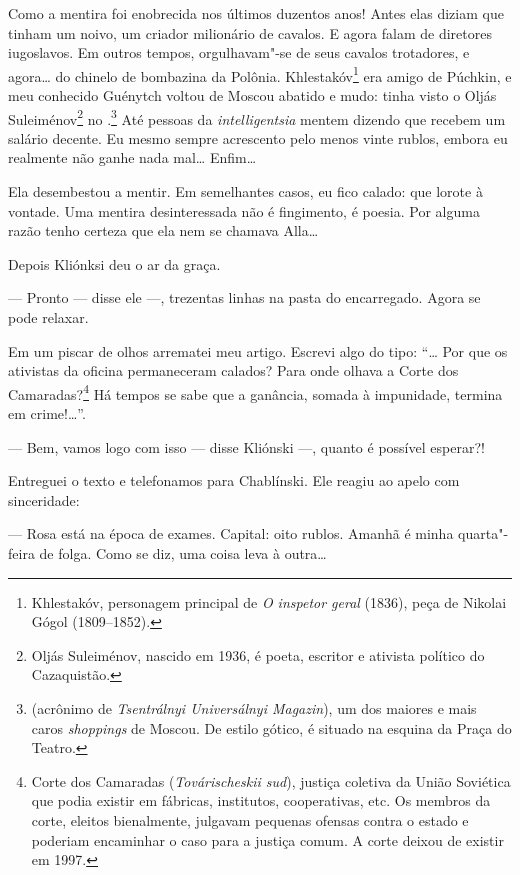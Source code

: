 Como a mentira foi enobrecida nos últimos duzentos anos! Antes elas
diziam que tinham um noivo, um criador milionário de cavalos. E agora
falam de diretores iugoslavos. Em outros tempos, orgulhavam"-se de seus
cavalos trotadores, e agora\ldots{} do chinelo de bombazina da Polônia.
Khlestakóv\footnote{Khlestakóv, personagem principal de \emph{O inspetor
  geral} (1836), peça de Nikolai Gógol (1809--1852).} era amigo
de Púchkin, e meu conhecido Guénytch voltou de Moscou abatido e mudo:
tinha visto o Oljás Suleiménov\footnote{Oljás Suleiménov, nascido em
  1936, é poeta, escritor e ativista político do Cazaquistão.} no
.\footnote{ (acrônimo de \emph{Tsentrálnyi Universálnyi
  Magazin}), um dos maiores e mais caros \emph{shoppings} de Moscou. De
  estilo gótico, é situado na esquina da Praça do Teatro.} Até pessoas
da \emph{intelligentsia} mentem dizendo que recebem um salário decente.
Eu mesmo sempre acrescento pelo menos vinte rublos, embora eu realmente
não ganhe nada mal\ldots{} Enfim\ldots{}

Ela desembestou a mentir. Em semelhantes casos, eu fico calado: que
lorote à vontade. Uma mentira desinteressada não é fingimento, é poesia.
Por alguma razão tenho certeza que ela nem se chamava Alla\ldots{}

Depois Kliónksi deu o ar da graça.

--- Pronto --- disse ele ---, trezentas linhas na pasta do encarregado.
Agora se pode relaxar.

Em um piscar de olhos arrematei meu artigo. Escrevi algo do tipo: ``\ldots{}
Por que os ativistas da oficina permaneceram calados? Para onde olhava a
Corte dos Camaradas?\footnote{Corte dos Camaradas (\emph{Továrischeskii
sud}), justiça coletiva da União Soviética que podia existir em
  fábricas, institutos, cooperativas, etc. Os membros da corte, eleitos
  bienalmente, julgavam pequenas ofensas contra o esta­do e poderiam
  encaminhar o caso para a justiça comum. A corte deixou de existir em
  1997.} Há tempos se sabe que a ganância, somada à impunidade, termina
em crime!\ldots{}''.

--- Bem, vamos logo com isso --- disse Kliónski ---, quanto é possível
esperar?!

Entreguei o texto e telefonamos para Chablínski. Ele reagiu ao apelo com
sinceridade:

--- Rosa está na época de exames. Capital: oito rublos. Amanhã é minha
quarta"-feira de folga. Como se diz, uma coisa leva à outra\ldots{}

